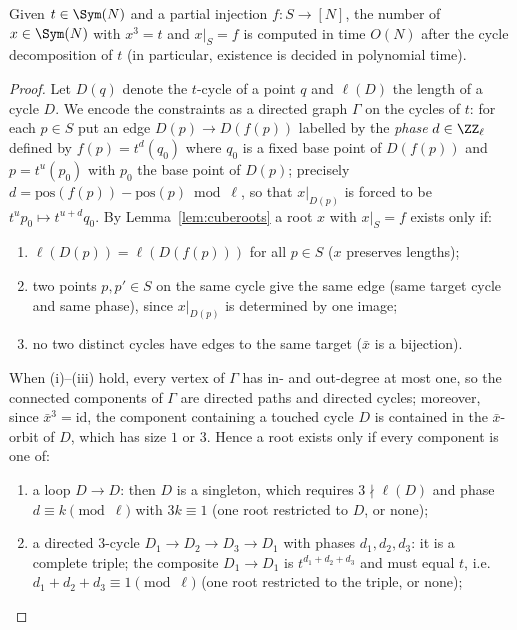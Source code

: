 \begin{lem}\label{lem:prescribed}
Given $t\in\Sym(N)$ and a partial injection $f\colon S\to[N]$, the number of $x\in\Sym(N)$ with $x^{3}=t$ and $x|_{S}=f$ is computed in time $O(N)$ after the cycle decomposition of $t$ (in particular, existence is decided in polynomial time).
\end{lem}
\begin{proof}
Let $D(q)$ denote the $t$-cycle of a point $q$ and $\ell(D)$ the length of a cycle $D$. We encode the constraints as a directed graph $\Gamma$ on the cycles of $t$: for each $p\in S$ put an edge $D(p)\to D(f(p))$ labelled by the \emph{phase} $d\in\ZZ_{\ell}$ defined by $f(p)=t^{d}(q_{0})$ where $q_0$ is a fixed base point of $D(f(p))$ and $p=t^{u}(p_0)$ with $p_0$ the base point of $D(p)$; precisely $d=\mathrm{pos}(f(p))-\mathrm{pos}(p)\bmod\ell$, so that $x|_{D(p)}$ is forced to be $t^{u}p_0\mapsto t^{u+d}q_0$. By Lemma~\ref{lem:cuberoots} a root $x$ with $x|_S=f$ exists only if:
\begin{enumerate}
\item[(i)] $\ell(D(p))=\ell(D(f(p)))$ for all $p\in S$ ($x$ preserves lengths);
\item[(ii)] two points $p,p'\in S$ on the same cycle give the same edge (same target cycle and same phase), since $x|_{D(p)}$ is determined by one image;
\item[(iii)] no two distinct cycles have edges to the same target ($\bar x$ is a bijection).
\end{enumerate}
When (i)--(iii) hold, every vertex of $\Gamma$ has in- and out-degree at most one, so the connected components of $\Gamma$ are directed paths and directed cycles; moreover, since $\bar x^{3}=\mathrm{id}$, the component containing a touched cycle $D$ is contained in the $\bar x$-orbit of $D$, which has size $1$ or $3$. Hence a root exists only if every component is one of:
\begin{enumerate}
\item[(a)] a loop $D\to D$: then $D$ is a singleton, which requires $3\nmid\ell(D)$ and phase $d\equiv k\pmod\ell$ with $3k\equiv1$ (one root restricted to $D$, or none);
\item[(b)] a directed $3$-cycle $D_1\to D_2\to D_3\to D_1$ with phases $d_1,d_2,d_3$: it is a complete triple; the composite $D_1\to D_1$ is $t^{d_1+d_2+d_3}$ and must equal $t$, i.e.\ $d_1+d_2+d_3\equiv1\pmod\ell$ (one root restricted to the triple, or none);

\end{enumerate}
\end{proof}
